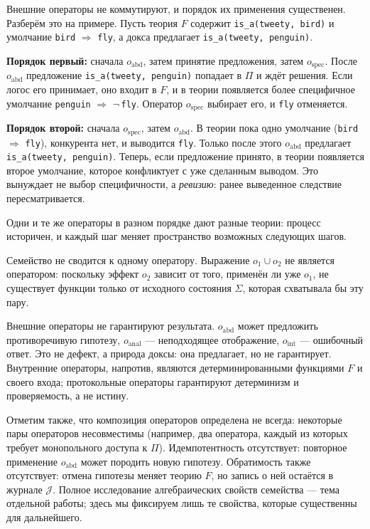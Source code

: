 \documentclass[12pt,a4paper]{article}
\begin{document}
Внешние операторы не коммутируют, и порядок их применения существенен.
Разберём это на примере. Пусть теория $F$ содержит
\texttt{is\_a(tweety, bird)} и умолчание
\texttt{bird} $\Rightarrow$ \texttt{fly}, а докса предлагает
\texttt{is\_a(tweety, penguin)}.

\textbf{Порядок первый:} сначала $o_{\text{abd}}$, затем принятие
предложения, затем $o_{\text{spec}}$. После $o_{\text{abd}}$ предложение
\texttt{is\_a(tweety, penguin)} попадает в $\Pi$ и ждёт решения. Если
логос его принимает, оно входит в $F$, и в теории появляется более
специфичное умолчание \texttt{penguin} $\Rightarrow$ $\neg$\,\texttt{fly}.
Оператор $o_{\text{spec}}$ выбирает его, и \texttt{fly} отменяется.

\textbf{Порядок второй:} сначала $o_{\text{spec}}$, затем $o_{\text{abd}}$.
В теории пока одно умолчание (\texttt{bird} $\Rightarrow$ \texttt{fly}),
конкурента нет, и выводится \texttt{fly}. Только после этого $o_{\text{abd}}$
предлагает \texttt{is\_a(tweety, penguin)}. Теперь, если предложение
принято, в теории появляется второе умолчание, которое конфликтует с уже
сделанным выводом. Это вынуждает не выбор специфичности, а \emph{ревизию}:
ранее выведенное следствие пересматривается.

Одни и те же операторы в разном порядке дают разные теории: процесс
историчен, и каждый шаг меняет пространство возможных следующих шагов.

Семейство не сводится к одному оператору. Выражение $o_1 \cup o_2$ не
является оператором: поскольку эффект $o_2$ зависит от того, применён ли
уже $o_1$, не существует функции только от исходного состояния $\Sigma$,
которая схватывала бы эту пару.

Внешние операторы не гарантируют результата. $o_{\text{abd}}$ может
предложить противоречивую гипотезу, $o_{\text{anal}}$ --- неподходящее
отображение, $o_{\text{int}}$ --- ошибочный ответ. Это не дефект, а природа
доксы: она предлагает, но не гарантирует. Внутренние операторы, напротив,
являются детерминированными функциями $F$ и своего входа; протокольные
операторы гарантируют детерминизм и проверяемость, а не истину.

Отметим также, что композиция операторов определена не всегда:
некоторые пары операторов несовместимы (например, два оператора, каждый
из которых требует монопольного доступа к $\Pi$). Идемпотентность
отсутствует: повторное применение $o_{\text{abd}}$ может породить новую
гипотезу. Обратимость также отсутствует: отмена гипотезы меняет теорию
$F$, но запись о ней остаётся в журнале $\mathcal{J}$. Полное исследование
алгебраических свойств семейства --- тема отдельной работы; здесь мы
фиксируем лишь те свойства, которые существенны для дальнейшего.
\end{document}
